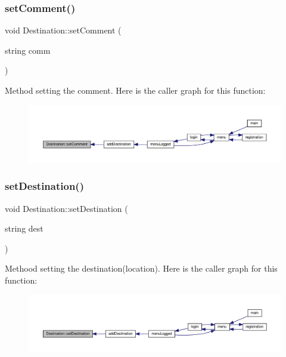 \subsubsection{\texorpdfstring{set\+Comment()}{setComment()}}
{\footnotesize\ttfamily void Destination\+::set\+Comment (\begin{DoxyParamCaption}\item[{string}]{comm }\end{DoxyParamCaption})}

Method setting the comment. Here is the caller graph for this function\+:\nopagebreak
\begin{figure}[H]
\begin{center}
\leavevmode
\includegraphics[width=350pt]{class_destination_a08199ade6e0bf7488d796d85dec8cfd9_icgraph}
\end{center}
\end{figure}
\mbox{\label{class_destination_a9cafaaf83be9ea548401caf2a2c4d839}} 
\subsubsection{\texorpdfstring{set\+Destination()}{setDestination()}}
{\footnotesize\ttfamily void Destination\+::set\+Destination (\begin{DoxyParamCaption}\item[{string}]{dest }\end{DoxyParamCaption})}

Methood setting the destination(location). Here is the caller graph for this function\+:\nopagebreak
\begin{figure}[H]
\begin{center}
\leavevmode
\includegraphics[width=350pt]{class_destination_a9cafaaf83be9ea548401caf2a2c4d839_icgraph}
\end{center}
\end{figure}
\mbox{\label{class_destination_a6fc539f51a5fd6844fef290facc4e887}} 
